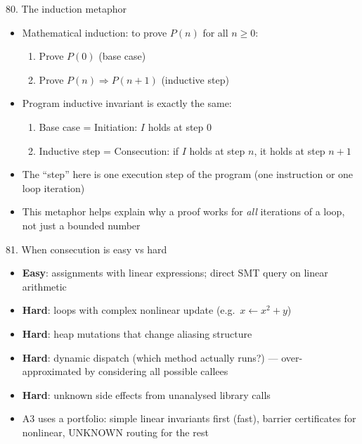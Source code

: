\documentclass[aspectratio=169]{beamer}
\begin{document}
\begin{frame}{80. The induction metaphor}
\begin{itemize}
  \item Mathematical induction: to prove \(P(n)\) for all \(n \ge 0\):
    \begin{enumerate}
      \item Prove \(P(0)\) (base case)
      \item Prove \(P(n) \Rightarrow P(n+1)\) (inductive step)
    \end{enumerate}
  \item Program inductive invariant is exactly the same:
    \begin{enumerate}
      \item Base case = Initiation: \(I\) holds at step 0
      \item Inductive step = Consecution: if \(I\) holds at step \(n\), it holds at step \(n+1\)
    \end{enumerate}
  \item The ``step'' here is one execution step of the program (one instruction or one loop iteration)
  \item This metaphor helps explain why a proof works for \emph{all} iterations of a loop, not just a bounded number
\end{itemize}
\end{frame}

\begin{frame}{81. When consecution is easy vs hard}
\begin{itemize}
  \item \textbf{Easy}: assignments with linear expressions; direct SMT query on linear arithmetic
  \item \textbf{Hard}: loops with complex nonlinear update (e.g.\ \(x \leftarrow x^2 + y\))
  \item \textbf{Hard}: heap mutations that change aliasing structure
  \item \textbf{Hard}: dynamic dispatch (which method actually runs?) --- over-approximated by considering all possible callees
  \item \textbf{Hard}: unknown side effects from unanalysed library calls
  \item A3 uses a portfolio: simple linear invariants first (fast), barrier certificates for nonlinear, UNKNOWN routing for the rest
\end{itemize}
\end{frame}
\end{document}
